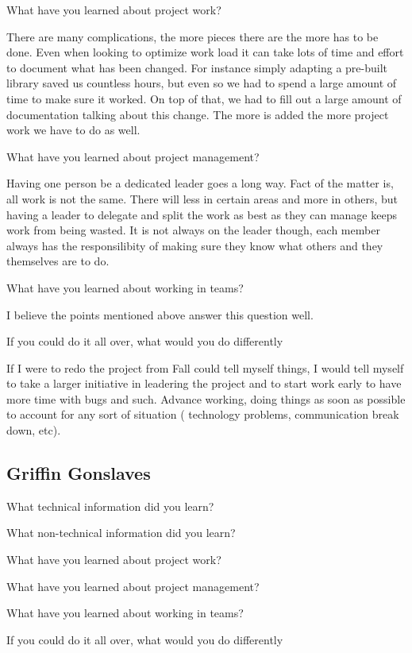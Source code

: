 \documentclass[letterpaper, 10pt, draftclsnofoot, compsoc, onecolumn]{IEEEtran}
\begin{document}
What have you learned about project work?

There are many complications, the more pieces there are the more has to be done. Even when looking to optimize work load it can take lots of time and effort to document what has been changed. For instance simply adapting a pre-built library saved us countless hours, but even so we had to spend a large amount of time to make sure it worked. On top of that, we had to fill out a large amount of documentation talking about this change. The more is added the more project work we have to do as well.

What have you learned about project management?

Having one person be a dedicated leader goes a long way. Fact of the matter is, all work is not the same. There will less in certain areas and more in others, but having a leader to delegate and split the work as best as they can manage keeps work from being wasted. It is not always on the leader though, each member always has the responsilibity of making sure they know what others and they themselves are to do.

What have you learned about working in teams?

I believe the points mentioned above answer this question well.

If you could do it all over, what would you do differently

If I were to redo the project from Fall could tell myself things, I would tell myself to take a larger initiative in leadering the project and to start work early to have more time with bugs and such. Advance working, doing things as soon as possible to account for any sort of situation ( technology problems, communication break down, etc).

\subsection{Griffin Gonslaves}
What technical information did you learn?

What non-technical information did you learn?

What have you learned about project work?

What have you learned about project management?

What have you learned about working in teams?

If you could do it all over, what would you do differently
\end{document}
